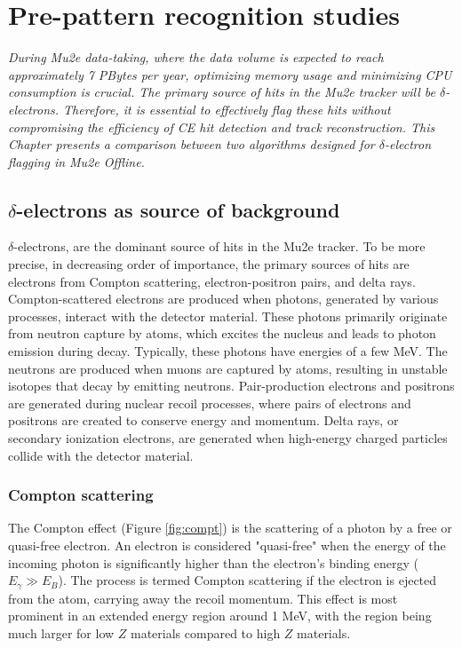 \chapter{Pre-pattern recognition studies}\label{delta}
\textit{During Mu2e data-taking, 
where the data volume is expected to reach 
approximately 7 PBytes per year, optimizing 
memory usage and minimizing CPU consumption 
is crucial. The primary source of hits in the 
Mu2e tracker will be $\delta$-electrons. 
Therefore, it is essential to effectively flag these 
hits without compromising the efficiency 
of CE hit detection and track reconstruction. This 
Chapter presents a comparison between 
two algorithms designed for $\delta$-electron 
flagging in Mu2e Offline.}

\section{$\delta$-electrons as source of background}

$\delta$-electrons, are the dominant source of hits 
in the Mu2e tracker. To be more precise, in decreasing order 
of importance, the primary sources of hits are electrons 
from Compton scattering, electron-positron pairs, and delta rays.
Compton-scattered electrons are produced 
when photons, generated by various processes, interact with the 
detector material. These photons primarily originate from 
neutron capture by atoms, which excites the nucleus and leads 
to photon emission during decay. Typically, these photons have 
energies of a few MeV. The neutrons are produced when muons are 
captured by atoms, resulting in unstable isotopes that decay by 
emitting neutrons. Pair-production electrons and positrons are 
generated during nuclear recoil processes, where pairs of electrons 
and positrons are created to conserve energy and momentum. Delta rays, 
or secondary ionization electrons, are generated when high-energy 
charged particles collide with the detector material.


\subsection{Compton scattering}
The Compton effect (Figure \ref{fig:compt}) is the 
scattering of a photon by a free or quasi-free electron. 
An electron is considered "quasi-free" when the energy of 
the incoming photon is significantly higher than the 
electron's binding energy ($E_\gamma \gg E_B$). The 
process is termed Compton scattering if the 
electron is ejected from the atom, carrying away the 
recoil momentum. This effect is most prominent in an 
extended energy region around 1 MeV, with the region 
being much larger for low $Z$ materials compared to high $Z$ materials.

